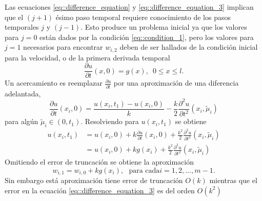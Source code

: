 \documentclass[a4paper]{article}
\begin{document}
Las ecuaciones \ref{eq::difference_equation} y \ref{eq::difference_equation_3} implican que el $(j+1)$ ésimo paso temporal requiere conocimiento de los pasos temporales $j$ y $(j-1)$. Esto produce un problema inicial ya que los valores para $j=0$ están dados por la condición \ref{eq::condition_1}, pero los valores para $j=1$ necesarios para encontrar $w_{i,2}$ deben de ser hallados de la condición inicial para la velocidad, o de la primera derivada temporal
\begin{equation}
\frac{\partial u}{\partial t}(x,0)=g(x),\,\,\,0\leq x \leq l.
\end{equation}
Un acercamiento es reemplazar $\frac{\partial u}{\partial t}$ por una aproximación de una diferencia adelantada,
\begin{equation}
\frac{\partial u}{\partial t}(x_i,0)=\frac{u(x_i,t_1)-u(x_i,0)}{k}-\frac{k}{2}\frac{\partial^2 u}{\partial t^2}(x_i,\tilde{\mu}_i)
\end{equation}
para algún $\tilde{\mu}_i \in (0,t_1)$. Resolviendo para $u(x_i,t_1)$ se obtiene
\begin{equation}
\begin{aligned}
u(x_i,t_1)&=u(x_i,0)+k\frac{\partial u}{\partial t}(x_i,0)+\frac{k^2}{2}\frac{\partial^2 u}{\partial t^2}(x_i,\tilde{\mu}_i)\\
&=u(x_i,0)+kg(x_i)+\frac{k^2}{2}\frac{\partial^2 u}{\partial t^2}(x_i,\tilde{\mu}_i)
\end{aligned}
\end{equation} 
Omitiendo el error de truncación se obtiene la aproximación
\begin{equation}
w_{i,1}=w_{i,0}+kg(x_i),\,\,\,\,\text{para cada} i=1,2,\hdots,m-1.
\end{equation}
Sin embargo está aproximación tiene error de truncación $O(k)$ mientras que el error en la ecuación \ref{eq::difference_equation_3} es del orden $O(k^2)$
\end{document}
